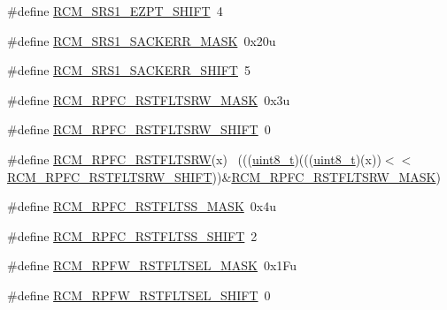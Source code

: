 \begin{DoxyCompactItemize}
\#define \hyperlink{group___r_c_m___register___masks_ga709ca27033c866f17c9e80ccf6df88b6}{R\+C\+M\+\_\+\+S\+R\+S1\+\_\+\+E\+Z\+P\+T\+\_\+\+S\+H\+I\+FT}~4
\item 
\#define \hyperlink{group___r_c_m___register___masks_gaa09459c8ed6200a5828221f9d15656d3}{R\+C\+M\+\_\+\+S\+R\+S1\+\_\+\+S\+A\+C\+K\+E\+R\+R\+\_\+\+M\+A\+SK}~0x20u
\item 
\#define \hyperlink{group___r_c_m___register___masks_gab30a0b3f954edb8a480649686bd208fb}{R\+C\+M\+\_\+\+S\+R\+S1\+\_\+\+S\+A\+C\+K\+E\+R\+R\+\_\+\+S\+H\+I\+FT}~5
\item 
\#define \hyperlink{group___r_c_m___register___masks_ga36e0fc448dc94b90314dd6dd2dd41763}{R\+C\+M\+\_\+\+R\+P\+F\+C\+\_\+\+R\+S\+T\+F\+L\+T\+S\+R\+W\+\_\+\+M\+A\+SK}~0x3u
\item 
\#define \hyperlink{group___r_c_m___register___masks_gad869b7629ba10023abe459d7293fd281}{R\+C\+M\+\_\+\+R\+P\+F\+C\+\_\+\+R\+S\+T\+F\+L\+T\+S\+R\+W\+\_\+\+S\+H\+I\+FT}~0
\item 
\#define \hyperlink{group___r_c_m___register___masks_ga3ca72ed675321a6b8939c43f1616ecc6}{R\+C\+M\+\_\+\+R\+P\+F\+C\+\_\+\+R\+S\+T\+F\+L\+T\+S\+RW}(x)                                    ~(((\hyperlink{_p_e___types_8h_aba7bc1797add20fe3efdf37ced1182c5}{uint8\+\_\+t})(((\hyperlink{_p_e___types_8h_aba7bc1797add20fe3efdf37ced1182c5}{uint8\+\_\+t})(x))$<$$<$\hyperlink{group___r_c_m___register___masks_gad869b7629ba10023abe459d7293fd281}{R\+C\+M\+\_\+\+R\+P\+F\+C\+\_\+\+R\+S\+T\+F\+L\+T\+S\+R\+W\+\_\+\+S\+H\+I\+FT}))\&\hyperlink{group___r_c_m___register___masks_ga36e0fc448dc94b90314dd6dd2dd41763}{R\+C\+M\+\_\+\+R\+P\+F\+C\+\_\+\+R\+S\+T\+F\+L\+T\+S\+R\+W\+\_\+\+M\+A\+SK})
\item 
\#define \hyperlink{group___r_c_m___register___masks_gadfb0f8132fbbc978c9756a2adfbf2ed0}{R\+C\+M\+\_\+\+R\+P\+F\+C\+\_\+\+R\+S\+T\+F\+L\+T\+S\+S\+\_\+\+M\+A\+SK}~0x4u
\item 
\#define \hyperlink{group___r_c_m___register___masks_ga4c39eb26fa537bf5e4e6b0ea82ffaeb2}{R\+C\+M\+\_\+\+R\+P\+F\+C\+\_\+\+R\+S\+T\+F\+L\+T\+S\+S\+\_\+\+S\+H\+I\+FT}~2
\item 
\#define \hyperlink{group___r_c_m___register___masks_ga60f29f78d245476ae9716d81b5728739}{R\+C\+M\+\_\+\+R\+P\+F\+W\+\_\+\+R\+S\+T\+F\+L\+T\+S\+E\+L\+\_\+\+M\+A\+SK}~0x1\+Fu
\item 
\#define \hyperlink{group___r_c_m___register___masks_ga489d9757284af48af000b769d36bf21a}{R\+C\+M\+\_\+\+R\+P\+F\+W\+\_\+\+R\+S\+T\+F\+L\+T\+S\+E\+L\+\_\+\+S\+H\+I\+FT}~0
\item 
$$
\end{DoxyCompactItemize}
